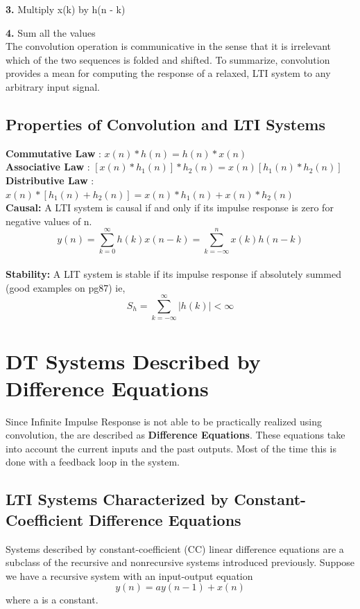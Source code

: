\documentclass{article} %
\begin{document}
	\textbf{3.} Multiply x(k) by h(n - k)
	
	\textbf{4.} Sum all the values \\
	The convolution operation is communicative in the sense that it is irrelevant which of the two sequences is folded and shifted. To summarize, convolution provides a mean for computing the response of a relaxed, LTI system to any arbitrary input signal.
	
	\subsection{Properties of Convolution and LTI Systems}

	\textbf{Commutative Law} : $x(n) \ast h(n) = h(n) \ast x(n)$ \\
	\textbf{Associative Law} : $[x(n) \ast h_1(n)] \ast h_2(n) = x(n) [h_1(n) \ast h_2(n)]$ \\
	\textbf{Distributive Law} : $ x(n) \ast [h_1(n) + h_2(n)] = x(n) \ast h_1(n) + x(n) \ast h_2(n)$ \\
	\textbf{Causal:} A LTI system is causal if and only if its impulse response is zero for negative values of n. \\
	\begin{equation}
 	y(n) = \sum_{k=0}^{\infty} h(k)x(n-k) = \sum_{k=-\infty}^n x(k)h(n-k)
	\end{equation} \\
	\textbf{Stability:} A LIT system is stable if its impulse response if absolutely summed (good examples on pg87) ie,
	\begin{equation}
 	S_h = \sum_{k=-\infty}^{\infty} |h(k)| < \infty
	\end{equation}
	
	\section{DT Systems Described by Difference Equations}
	Since Infinite Impulse Response is not able to be practically realized using convolution, the are described as \textbf{Difference Equations}. These equations take into account the current inputs and the past outputs. Most of the time this is done with a feedback loop in the system.	
	\subsection{LTI Systems Characterized by Constant-Coefficient Difference Equations}
	Systems described by constant-coefficient (CC) linear difference equations are a subclass of the recursive and nonrecursive systems introduced previously. Suppose we have a recursive system with an input-output equation
	\begin{equation}
 	y(n) = ay(n-1) + x(n)
	\end{equation}
	where a is a constant. 
	
\end{document}
